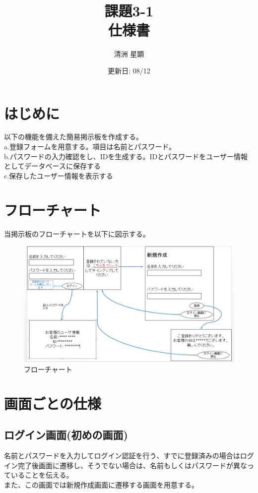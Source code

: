 \documentclass[a4paper,11pt]{jsarticle}
\title{課題3-1\\仕様書}
\author{清洲 星顕}
\date{更新日: 08/12}
\begin{document}
\maketitle
\section{はじめに}
\noindent
以下の機能を備えた簡易掲示板を作成する。\\
a.登録フォームを用意する。項目は名前とパスワード。\\
b.パスワードの入力確認をし、IDを生成する。IDとパスワードをユーザー情報としてデータベースに保存する\\
c.保存したユーザー情報を表示する

\section{フローチャート}
当掲示板のフローチャートを以下に図示する。
    \begin{figure}[htbp]
            \includegraphics[clip,width=150mm]{intern_siyousho.PNG}
            \caption{フローチャート}
    \end{figure}
\newpage
\section{画面ごとの仕様}
\noindent


\subsection{ログイン画面(初めの画面)}
\noindent
名前とパスワードを入力してログイン認証を行う、すでに登録済みの場合はログイン完了後画面に遷移し、そうでない場合は、名前もしくはパスワードが異なっていることを伝える。\\
また、この画面では新規作成画面に遷移する画面を用意する。
    
\end{document}
